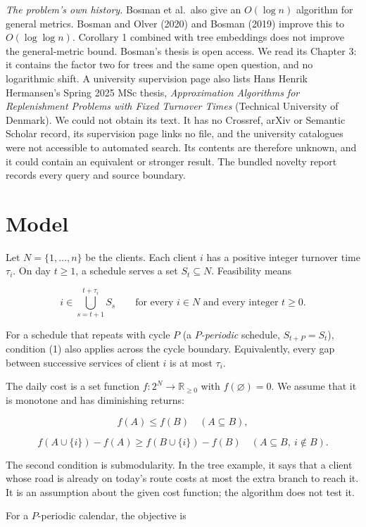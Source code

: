 \documentclass[
  british,
  11pt,
  a4paper,
]{article}
\begin{document}
\emph{The problem's own history.} Bosman et al.~also give an
\(O(\log n)\) algorithm for general metrics. Bosman and Olver (2020) and
Bosman (2019) improve this to \(O(\log\log n)\). Corollary 1 combined
with tree embeddings does not improve the general-metric bound. Bosman's
thesis is open access. We read its Chapter 3: it contains the factor two
for trees and the same open question, and no logarithmic shift. A
university supervision page also lists Hans Henrik Hermansen's Spring
2025 MSc thesis, \emph{Approximation Algorithms for Replenishment
Problems with Fixed Turnover Times} (Technical University of Denmark).
We could not obtain its text. It has no Crossref, arXiv or Semantic
Scholar record, its supervision page links no file, and the university
catalogues were not accessible to automated search. Its contents are
therefore unknown, and it could contain an equivalent or stronger
result. The bundled novelty report records every query and source
boundary.

\section{Model}\label{model}

Let \(N=\{1,\ldots,n\}\) be the clients. Each client \(i\) has a
positive integer turnover time \(\tau_i\). On day \(t\ge1\), a schedule
serves a set \(S_t\subseteq N\). Feasibility means

\[
i\in\bigcup_{s=t+1}^{t+\tau_i}S_s
\qquad\text{for every }i\in N\text{ and every integer }t\ge0. \tag{1}
\]

For a schedule that repeats with cycle \(P\) (a \emph{\(P\)-periodic}
schedule, \(S_{t+P}=S_t\)), condition (1) also applies across the cycle
boundary. Equivalently, every gap between successive services of client
\(i\) is at most \(\tau_i\).

The daily cost is a set function \(f:2^N\to\mathbb R_{\ge0}\) with
\(f(\varnothing)=0\). We assume that it is monotone and has diminishing
returns:

\[
f(A)\le f(B)\quad(A\subseteq B),
\]

\[
f(A\cup\{i\})-f(A)\ge f(B\cup\{i\})-f(B)
\quad(A\subseteq B,\ i\notin B). \tag{2}
\]

The second condition is submodularity. In the tree example, it says that
a client whose road is already on today's route costs at most the extra
branch to reach it. It is an assumption about the given cost function;
the algorithm does not test it.

For a \(P\)-periodic calendar, the objective is
\end{document}
